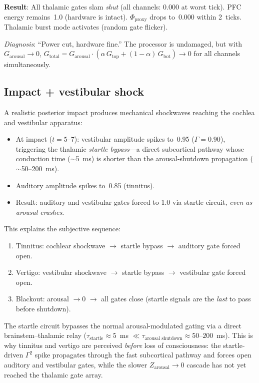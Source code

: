 \documentclass[aps,pre,twocolumn,superscriptaddress,floatfix]{revtex4-2}
\newcommand{\Zarousal}{G_{\text{arousal}}}
\begin{document}
\textbf{Result}: All thalamic gates slam \emph{shut}
(all channels: 0.000 at worst tick).
PFC energy remains~1.0 (hardware is intact).
$\Phi_{\text{proxy}}$ drops to~0.000 within 2~ticks.
Thalamic burst mode activates (random gate flicker).

\emph{Diagnosis}: ``Power cut, hardware fine.''
The processor is undamaged, but with $\Zarousal\to 0$,
$G_{\text{total}}=\Zarousal\cdot(\alpha\,G_{\text{top}}+(1-\alpha)\,G_{\text{bot}})\to 0$
for all channels simultaneously.

\subsection{Impact + vestibular shock}

A realistic posterior impact produces mechanical shockwaves
reaching the cochlea and vestibular apparatus:
\begin{itemize}
  \item At impact ($t=5$--$7$): vestibular amplitude spikes
    to~0.95 ($\Gamma=0.90$), triggering the thalamic
    \emph{startle bypass}---a direct subcortical pathway
    whose conduction time ($\sim$5~ms) is shorter than
    the arousal-shutdown propagation ($\sim$50--200~ms).
  \item Auditory amplitude spikes to~0.85 (tinnitus).
  \item Result: auditory and vestibular gates forced to 1.0
    via startle circuit, \emph{even as arousal crashes}.
\end{itemize}

This explains the subjective sequence:
\begin{enumerate}
  \item Tinnitus: cochlear shockwave $\to$ startle bypass $\to$
    auditory gate forced open.
  \item Vertigo: vestibular shockwave $\to$ startle bypass $\to$
    vestibular gate forced open.
  \item Blackout: arousal $\to 0$ $\to$ all gates close
    (startle signals are the \emph{last} to pass before shutdown).
\end{enumerate}

The startle circuit bypasses the normal
arousal-modulated gating via a direct
brainstem--thalamic relay ($\tau_{\text{startle}}\approx
5$~ms $\ll \tau_{\text{arousal shutdown}}\approx
50$--$200$~ms).
This is why tinnitus and vertigo are perceived
\emph{before} loss of consciousness:
the startle-driven $\Gamma^2$ spike propagates through
the fast subcortical pathway and forces open auditory
and vestibular gates, while the slower
$Z_{\text{arousal}}\to 0$ cascade has not yet
reached the thalamic gate array.
\end{document}
